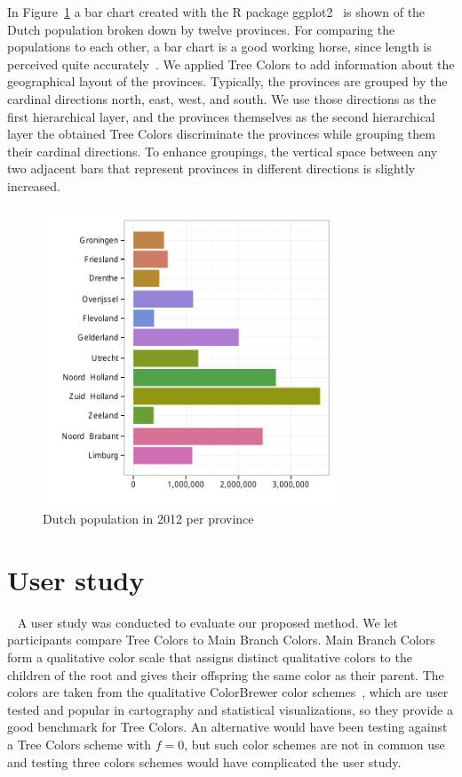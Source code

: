 \documentclass[journal]{vgtc}                %
\begin{document}
In Figure~\ref{fig:barApp} a bar chart created with the R package ggplot2~\cite{ggplot2} is shown of the Dutch population broken down by twelve provinces. For comparing the populations to each other, a bar chart is a good working horse, since length is perceived quite accurately~\cite{Mackinlay1986}. We applied Tree Colors to add information about the geographical layout of the provinces. Typically, the provinces are grouped by the cardinal directions north, east, west, and south. We use those directions as the first hierarchical layer, and the provinces themselves as the second hierarchical layer the obtained Tree Colors discriminate the provinces while grouping them their cardinal directions. To enhance groupings, the vertical space between any two adjacent bars that represent provinces in different directions is slightly increased.

\begin{figure}[!b]
  \centering
  \includegraphics[width=3.5in]{pop_bar.pdf}

  \caption{Dutch population in 2012 per province}\label{fig:barApp}

\end{figure}


\section{User study}~\label{secuser}
A user study was conducted to evaluate our proposed method. We let participants compare Tree Colors to Main Branch Colors. Main Branch Colors form a qualitative color scale that assigns distinct qualitative colors to the children of the root and gives their offspring the same color as their parent. The colors are taken from the qualitative ColorBrewer color schemes~\cite{brewer03}, which are user tested and popular in cartography and statistical visualizations, so they provide a good benchmark for Tree Colors. An alternative would have been testing
against a Tree Colors scheme with $f=0$, but such color schemes are not in common 
use and testing three colors schemes would have complicated the user study.
\end{document}
